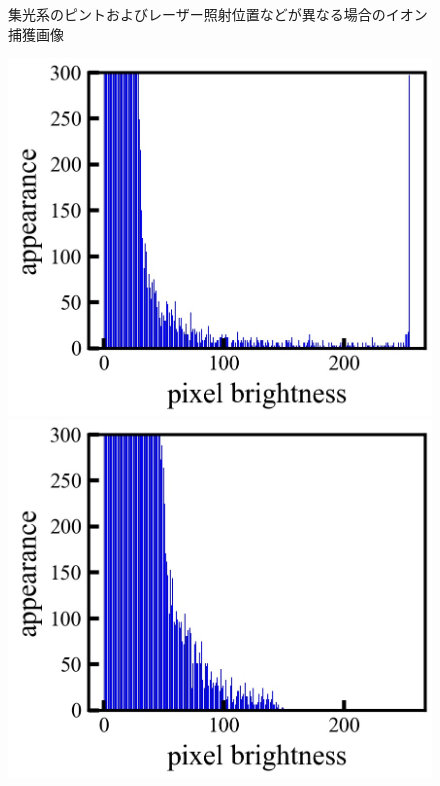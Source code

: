 \begin{figure}[h]
\begin{center}
\begin{minipage}{0.3\linewidth}
	\end{minipage}
	\end{center}
	\caption{集光系のピントおよびレーザー照射位置などが異なる場合のイオン捕獲画像}
	\label{fig:ionimage}
\end{figure}

\begin{figure}[h]
	\begin{center}
		\begin{minipage}{0.3\linewidth}
			\includegraphics[width=0.98\columnwidth]{./theory/figure/5/hist_0.jpg}
		\end{minipage}
		\begin{minipage}{0.3\linewidth}
			\includegraphics[width=0.98\columnwidth]{./theory/figure/5/hist_2.jpg}

\end{minipage}
\end{center}
\end{figure}
